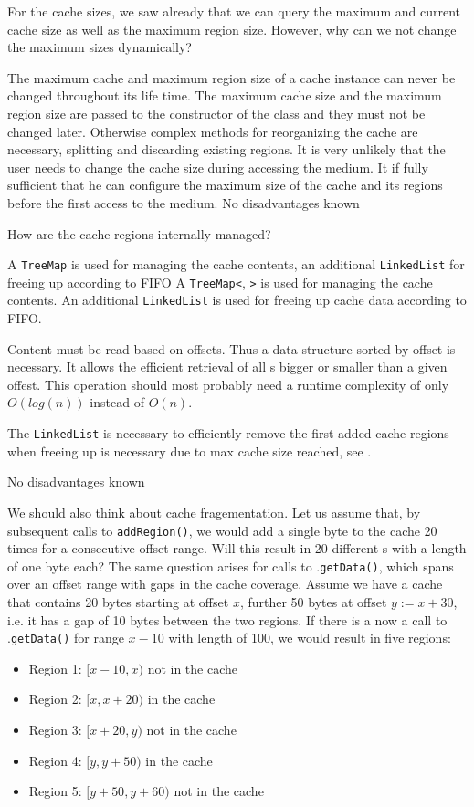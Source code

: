 For the cache sizes, we saw already that we can query the maximum and current cache size as well as the maximum region size. However, why can we not change the maximum sizes dynamically?

{%
The maximum cache and maximum region size of a cache instance can never be changed throughout its life time.
}
{%
The maximum cache size and the maximum region size are passed to the constructor of the \MediumCache{} class and they must not be changed later.
}
{%
Otherwise complex methods for reorganizing the cache are necessary, splitting and discarding existing regions. It is very unlikely that the user needs to change the cache size during accessing the medium. It if fully sufficient that he can configure the maximum size of the cache and its regions before the first access to the medium.
}
{%
No disadvantages known
}

How are the cache regions internally managed?

{%
A \texttt{TreeMap} is used for managing the cache contents, an additional \texttt{LinkedList} for freeing up according to FIFO
}
{%
A \texttt{TreeMap<}\IMediumReference{}, \MediumRegion{}\texttt{>} is used for managing the cache contents. An additional \texttt{LinkedList} is used for freeing up cache data according to FIFO.
}
{%
Content must be read based on offsets. Thus a data structure sorted by offset is necessary. It allows the efficient retrieval of all \MediumRegion{}s bigger or smaller than a given offest. This operation should most probably need a runtime complexity of only $O(log(n))$ instead of $O(n)$.

The \texttt{LinkedList} is necessary to efficiently remove the first added cache regions when freeing up is necessary due to max cache size reached, see .
}
{%
No disadvantages known
}

We should also think about cache fragementation. Let us assume that, by subsequent calls to \texttt{addRegion()}, we would add a single byte to the cache 20 times for a consecutive offset range. Will this result in 20 different \MediumRegion{}s with a length of one byte each? The same question arises for calls to \IMediumStore{}.\texttt{getData()}, which spans over an offset range with gaps in the cache coverage. Assume we have a cache that contains 20 bytes starting at offset $x$, further 50 bytes at offset $y:=x+30$, i.e. it has a gap of 10 bytes between the two regions. If there is a now a call to \IMediumStore{}.\texttt{getData()} for range $x-10$ with length of 100, we would result in five regions:
\begin{itemize}
\item Region 1: $[x-10,x)$ not in the cache
\item Region 2: $[x,x+20)$ in the cache
\item Region 3: $[x+20,y)$ not in the cache
\item Region 4: $[y,y+50)$ in the cache
\item Region 5: $[y+50,y+60)$ not in the cache
\end{itemize}

